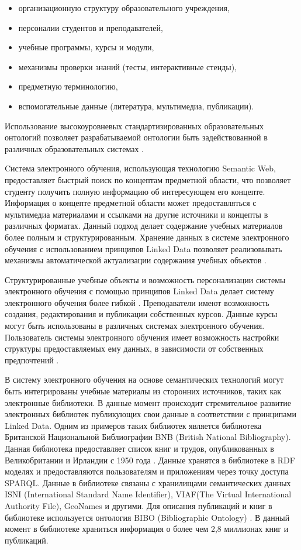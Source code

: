 \begin{itemize}
\item организационную структуру образовательного учреждения,
\item персоналии студентов и преподавателей,
\item учебные программы, курсы и модули,
\item механизмы проверки знаний (тесты, интерактивные стенды),
\item предметную терминологию,
\item вспомогательные данные (литература, мультимедиа, публикации).
\end{itemize}

Использование высокоуровневых стандартизированных образовательных онтологий позволяет разрабатываемой онтологии быть задействованной в различных образовательных системах \cite{bansal2012role}. 

Cистема электронного обучения, использующая технологию Semantic Web, предоставляет быстрый поиск по концептам предметной области, что позволяет студенту получить полную информацию об интересующем его концепте. Информация о концепте предметной области может предоставляться с мультимедиа материалами и ссылками на другие источники и концепты в различных форматах. Данный подход делает содержание учебных материалов более полным и структурированным. Хранение данных в системе электронного обучения с использованием принципов Linked Data позволяет реализовывать механизмы автоматической актуализации содержания учебных объектов \cite{mohan2003learning}. 

Структурированные учебные объекты и возможность персонализации системы электронного обучения с помощью принципов Linked Data делает систему электронного обучения более гибкой \cite{nilsson2002semantic}. Преподаватели имеют возможность создания, редактирования и публикации собственных курсов. Данные курсы могут быть использованы в различных системах электронного обучения. Пользователь системы электронного обучения имеет возможность настройки структуры предоставляемых ему данных, в зависимости от собственных предпочтений \cite{koper2004use}.  

В систему электронного обучения на основе семантических технологий могут быть интегрированы учебные материалы из сторонних источников, таких как электронные библиотеки. В данные момент происходит стремительное развитие электронных библиотек публикующих свои данные в соответствии с принципами Linked Data. Одним из примеров таких библиотек является библиотека Британской Национальной Библиографии BNB (British National Bibliography). Данная библиотека предоставляет список книг и трудов, опубликованных в Великобритании и Ирландии с 1950 года \cite{danskin2012tags}. Данные хранятся в библиотеке в RDF моделях и предоставляются пользователям и приложениям через точку доступа SPARQL. Данные в библиотеке связаны с хранилищами семантических данных ISNI (International Standard Name Identifier), VIAF(The Virtual International Authority File), GeoNames и другими. Для описания публикаций и книг в библиотеке используется онтология BIBO (Bibliographic Ontology) \cite{park2014organizing}. В данный момент в библиотеке храниться информация о более чем 2,8 миллионах книг и публикаций.

